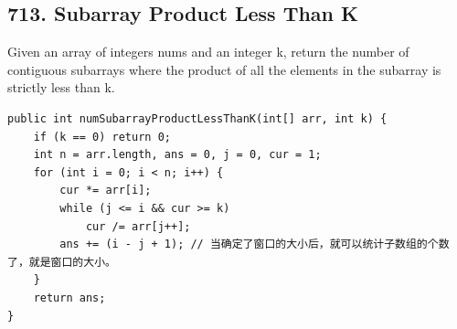 \documentclass[9pt, b5paaper]{book}
\begin{document}
\subsection{713. Subarray Product Less Than K}
\label{sec-5-0-3}
Given an array of integers nums and an integer k, return the number of contiguous subarrays where the product of all the elements in the subarray is strictly less than k.
\begin{verbatim}
public int numSubarrayProductLessThanK(int[] arr, int k) {
    if (k == 0) return 0;
    int n = arr.length, ans = 0, j = 0, cur = 1;
    for (int i = 0; i < n; i++) {
        cur *= arr[i];
        while (j <= i && cur >= k) 
            cur /= arr[j++];
        ans += (i - j + 1); // 当确定了窗口的大小后，就可以统计子数组的个数了，就是窗口的大小。
    }
    return ans;
}
\end{verbatim}
\end{document}
